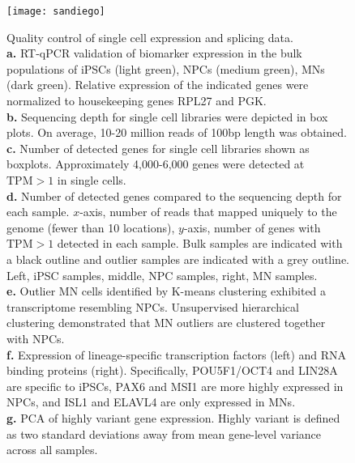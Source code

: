 \begin{figure}[h] 
  \texttt{[image: sandiego]}
  \caption[Quality control of single cell expression and splicing data.]{Quality control of single cell expression and splicing data.\\
\textbf{a.} RT-qPCR validation of biomarker expression in the bulk populations of iPSCs (light green), NPCs  (medium green), MNs (dark green). Relative expression of the indicated genes were normalized to housekeeping genes RPL27 and PGK. \\
\textbf{b.} Sequencing depth for single cell libraries were depicted in box plots. On average, 10-20 million reads of 100bp length was obtained. \\
\textbf{c.} Number of detected genes for single cell libraries shown as boxplots. Approximately 4,000-6,000 genes were detected at $\mathrm{TPM} > 1$ in single cells. \\
\textbf{d.} Number of detected genes compared to the sequencing depth for each sample. $x$-axis, number of reads that mapped uniquely to the genome (fewer than 10 locations), $y$-axis, number of genes with $\mathrm{TPM} > 1$ detected in each sample. Bulk samples are indicated with a black outline and outlier samples are indicated with a grey outline. Left, iPSC samples, middle, NPC samples, right, MN samples.\\
\textbf{e.} Outlier MN cells identified by K-means clustering exhibited a transcriptome resembling NPCs. Unsupervised hierarchical clustering demonstrated that MN outliers are clustered together with NPCs.\\
\textbf{f.} Expression of lineage-specific transcription factors (left) and RNA binding proteins (right). Specifically, POU5F1/OCT4 and LIN28A are specific to iPSCs, PAX6 and MSI1 are more highly expressed in NPCs, and ISL1 and ELAVL4 are only expressed in MNs. \\
\textbf{g.} PCA of highly variant gene expression. Highly variant is defined as two standard deviations away from mean gene-level variance across all samples.\\
}
\end{figure}
